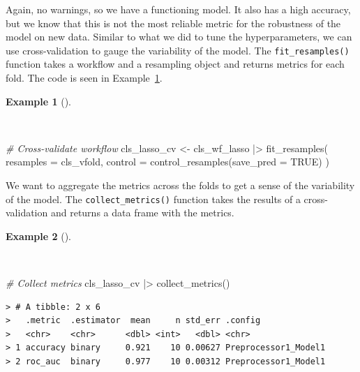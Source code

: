 \documentclass[
  letterpaper,
  DIV=11,
  numbers=noendperiod]{scrreprt}
\newenvironment{Shaded}{\begin{snugshade}}{\end{snugshade}}
\newcommand{\AttributeTok}[1]{\textcolor[rgb]{0.00,0.00,0.00}{#1}}
\newcommand{\CommentTok}[1]{\textcolor[rgb]{0.00,0.00,0.00}{\textit{#1}}}
\newcommand{\ConstantTok}[1]{\textcolor[rgb]{0.00,0.00,0.00}{#1}}
\newcommand{\FunctionTok}[1]{\textcolor[rgb]{0.00,0.00,0.00}{#1}}
\newcommand{\NormalTok}[1]{\textcolor[rgb]{0.00,0.00,0.00}{#1}}
\newcommand{\OtherTok}[1]{\textcolor[rgb]{0.00,0.00,0.00}{#1}}
\newcommand{\SpecialCharTok}[1]{\textcolor[rgb]{0.00,0.00,0.00}{#1}}
\theoremstyle{definition}
\newtheorem{example}{Example}[chapter]
\theoremstyle{remark}
\begin{document}
Again, no warnings, so we have a functioning model. It also has a high
accuracy, but we know that this is not the most reliable metric for the
robustness of the model on new data. Similar to what we did to tune the
hyperparameters, we can use cross-validation to gauge the variability of
the model. The \texttt{fit\_resamples()} function takes a workflow and a
resampling object and returns metrics for each fold. The code is seen in
Example~\ref{exm-pda-class-tune-hyperparameters-evaluate-workflow-cv}.

\begin{example}[]\protect\hypertarget{exm-pda-class-tune-hyperparameters-evaluate-workflow-cv}{}\label{exm-pda-class-tune-hyperparameters-evaluate-workflow-cv}

~

\begin{Shaded}
\begin{Highlighting}[]
\CommentTok{\# Cross{-}validate workflow}
\NormalTok{cls\_lasso\_cv }\OtherTok{\textless{}{-}}
\NormalTok{  cls\_wf\_lasso }\SpecialCharTok{|\textgreater{}}
  \FunctionTok{fit\_resamples}\NormalTok{(}
    \AttributeTok{resamples =}\NormalTok{ cls\_vfold,}
    \AttributeTok{control =} \FunctionTok{control\_resamples}\NormalTok{(}\AttributeTok{save\_pred =} \ConstantTok{TRUE}\NormalTok{)}
\NormalTok{  )}
\end{Highlighting}
\end{Shaded}

\end{example}

We want to aggregate the metrics across the folds to get a sense of the
variability of the model. The \texttt{collect\_metrics()} function takes
the results of a cross-validation and returns a data frame with the
metrics.

\begin{example}[]\protect\hypertarget{exm-pda-class-tune-hyperparameters-evaluate-workflow-cv-collect}{}\label{exm-pda-class-tune-hyperparameters-evaluate-workflow-cv-collect}

~

\begin{Shaded}
\begin{Highlighting}[]
\CommentTok{\# Collect metrics}
\NormalTok{cls\_lasso\_cv }\SpecialCharTok{|\textgreater{}}
  \FunctionTok{collect\_metrics}\NormalTok{()}
\end{Highlighting}
\end{Shaded}

\begin{verbatim}
> # A tibble: 2 x 6
>   .metric  .estimator  mean     n std_err .config             
>   <chr>    <chr>      <dbl> <int>   <dbl> <chr>               
> 1 accuracy binary     0.921    10 0.00627 Preprocessor1_Model1
> 2 roc_auc  binary     0.977    10 0.00312 Preprocessor1_Model1
\end{verbatim}

\end{example}
\end{document}
